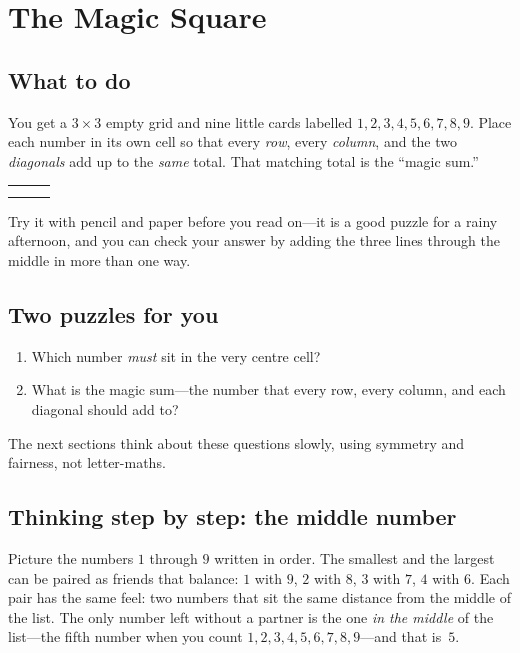 \chapter{The Magic Square}

\section{What to do}
You get a \(3\times 3\) empty grid and nine little cards labelled
\(1,2,3,4,5,6,7,8,9\). Place each number in its own cell so that every
\emph{row}, every \emph{column}, and the two \emph{diagonals} add up to the
\emph{same} total. That matching total is the ``magic sum.''

\begin{center}
\begin{tabular}{|c|c|c|}
\hline
\phantom{0} & \phantom{0} & \phantom{0} \\
\hline
\phantom{0} & \phantom{0} & \phantom{0} \\
\hline
\phantom{0} & \phantom{0} & \phantom{0} \\
\hline
\end{tabular}
\end{center}

\noindent
Try it with pencil and paper before you read on---it is a good puzzle for a
rainy afternoon, and you can check your answer by adding the three lines through
the middle in more than one way.

\section{Two puzzles for you}
\begin{enumerate}
  \item Which number \emph{must} sit in the very centre cell?
  \item What is the magic sum---the number that every row, every column, and
  each diagonal should add to?
\end{enumerate}

The next sections think about these questions slowly, using symmetry and
fairness, not letter-maths.

\section{Thinking step by step: the middle number}
Picture the numbers \(1\) through \(9\) written in order. The smallest and the
largest can be paired as friends that balance: \(1\) with \(9\), \(2\) with
\(8\), \(3\) with \(7\), \(4\) with \(6\). Each pair has the same feel: two
numbers that sit the same distance from the middle of the list. The only number
left without a partner is the one \emph{in the middle} of the list---the fifth
number when you count \(1,2,3,4,5,6,7,8,9\)---and that is~\(5\).

